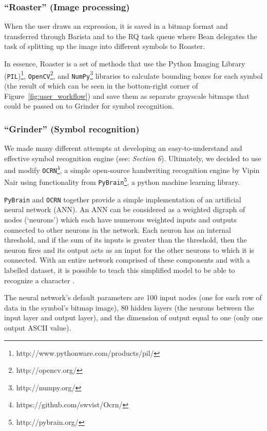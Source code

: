 \documentclass{acm_proc_article-sp}
\begin{document}
\subsubsection{``Roaster'' (Image processing)}
When the user draws an expression, it is saved in a bitmap format and transferred through Barista and to the RQ task queue where Bean delegates the task of splitting up the image into different symbols to Roaster.

In essence, Roaster is a set of methods that use the Python Imaging Library (\texttt{PIL})\footnote{http://www.pythonware.com/products/pil/}, \texttt{OpenCV}\footnote{http://opencv.org/}, and \texttt{NumPy}\footnote{http://numpy.org/} libraries to calculate bounding boxes for each symbol (the result of which can be seen in the bottom-right corner of Figure~\ref{fig:user_workflow}) and save them as separate grayscale bitmaps that could be passed on to Grinder for symbol recognition.

\label{subsection:roaster}
\subsubsection{``Grinder'' (Symbol recognition)}
We made many different attempts at developing an easy-to-understand and effective symbol recognition engine (see: \emph{Section 6}). Ultimately, we decided to use and modify  \texttt{OCRN}\footnote{https://github.com/swvist/Ocrn/}, a simple open-source handwriting recognition engine by Vipin Nair using functionality from \texttt{PyBrain}\footnote{http://pybrain.org/}, a python machine learning library.

\texttt{PyBrain} and \texttt{OCRN} together provide a simple implementation of an artificial neural network (ANN). An ANN can be considered as a weighted digraph of nodes (`neurons') which each have numerous weighted inputs and outputs connected to other neurons in the network. Each neuron has an internal threshold, and if the sum of its inputs is greater than the threshold, then the neuron fires and its output acts as an input for the other neurons to which it is connected. With an entire network comprised of these components and with a labelled dataset, it is possible to teach this simplified model to be able to recognize a character \cite{jain1996artificial}.

The neural network's default parameters are 100 input nodes (one for each row of data in the symbol's bitmap image), 80 hidden layers (the neurons between the input layer and output layer), and the dimension of output equal to one (only one output ASCII value).
\end{document}
